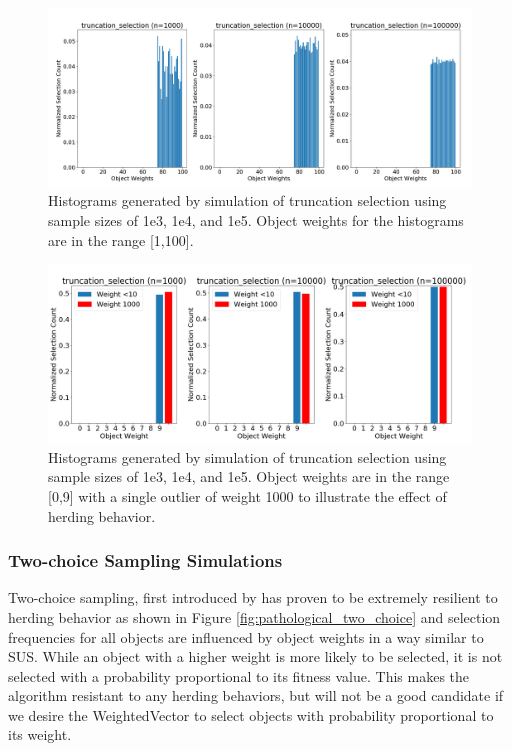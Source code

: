 \documentclass[12pt]{article}
\begin{document}
    \begin{figure}[h]
      \centering
      \includegraphics[scale=0.30]{images/herding_truncation.png} 
      \caption{Histograms generated by simulation of truncation selection
               using sample sizes of 1e3, 1e4, and 1e5. Object weights
               for the histograms are in the range [1,100].}
      \label{fig:herding_truncation}
    \end{figure}

    \begin{figure}[h]
      \centering
      \includegraphics[scale=0.30]{images/pathological_truncation.png} 
      \caption{Histograms generated by simulation of truncation selection
               using sample sizes of 1e3, 1e4, and 1e5. Object weights are in
               the range [0,9] with a single outlier of weight 1000 to
               illustrate the effect of herding behavior.}
      \label{fig:pathological_truncation}
    \end{figure}

    \subsubsection{Two-choice Sampling Simulations}
    Two-choice sampling, first introduced by %
    has proven to be extremely resilient to herding behavior as shown in
    Figure \ref{fig:pathological_two_choice} and selection frequencies for all
    objects are influenced by object weights in a way similar to SUS. While an
    object with a higher weight is more likely to be selected, it is not
    selected with a probability proportional to its fitness value. This makes
    the algorithm resistant to any herding behaviors, but will not be a good
    candidate if we desire the WeightedVector to select objects with
    probability proportional to its weight.
\end{document}
